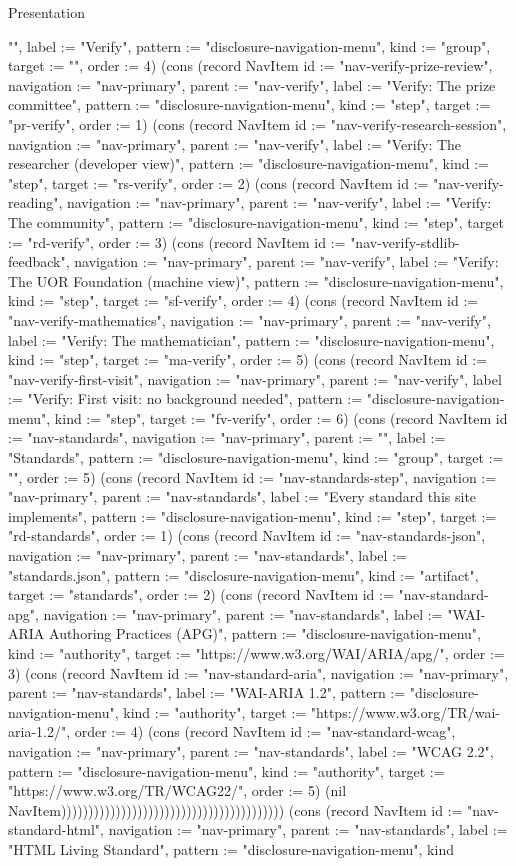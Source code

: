 \begin{lexlean}{Presentation}
\begin{semanticmodule}
{"", label := "Verify", pattern := "disclosure-navigation-menu", kind := "group", target := "", order := 4}) (cons (record NavItem {id := "nav-verify-prize-review", navigation := "nav-primary", parent := "nav-verify", label := "Verify: The prize committee", pattern := "disclosure-navigation-menu", kind := "step", target := "pr-verify", order := 1}) (cons (record NavItem {id := "nav-verify-research-session", navigation := "nav-primary", parent := "nav-verify", label := "Verify: The researcher (developer view)", pattern := "disclosure-navigation-menu", kind := "step", target := "rs-verify", order := 2}) (cons (record NavItem {id := "nav-verify-reading", navigation := "nav-primary", parent := "nav-verify", label := "Verify: The community", pattern := "disclosure-navigation-menu", kind := "step", target := "rd-verify", order := 3}) (cons (record NavItem {id := "nav-verify-stdlib-feedback", navigation := "nav-primary", parent := "nav-verify", label := "Verify: The UOR Foundation (machine view)", pattern := "disclosure-navigation-menu", kind := "step", target := "sf-verify", order := 4}) (cons (record NavItem {id := "nav-verify-mathematics", navigation := "nav-primary", parent := "nav-verify", label := "Verify: The mathematician", pattern := "disclosure-navigation-menu", kind := "step", target := "ma-verify", order := 5}) (cons (record NavItem {id := "nav-verify-first-visit", navigation := "nav-primary", parent := "nav-verify", label := "Verify: First visit: no background needed", pattern := "disclosure-navigation-menu", kind := "step", target := "fv-verify", order := 6}) (cons (record NavItem {id := "nav-standards", navigation := "nav-primary", parent := "", label := "Standards", pattern := "disclosure-navigation-menu", kind := "group", target := "", order := 5}) (cons (record NavItem {id := "nav-standards-step", navigation := "nav-primary", parent := "nav-standards", label := "Every standard this site implements", pattern := "disclosure-navigation-menu", kind := "step", target := "rd-standards", order := 1}) (cons (record NavItem {id := "nav-standards-json", navigation := "nav-primary", parent := "nav-standards", label := "standards.json", pattern := "disclosure-navigation-menu", kind := "artifact", target := "standards", order := 2}) (cons (record NavItem {id := "nav-standard-apg", navigation := "nav-primary", parent := "nav-standards", label := "WAI-ARIA Authoring Practices (APG)", pattern := "disclosure-navigation-menu", kind := "authority", target := "https://www.w3.org/WAI/ARIA/apg/", order := 3}) (cons (record NavItem {id := "nav-standard-aria", navigation := "nav-primary", parent := "nav-standards", label := "WAI-ARIA 1.2", pattern := "disclosure-navigation-menu", kind := "authority", target := "https://www.w3.org/TR/wai-aria-1.2/", order := 4}) (cons (record NavItem {id := "nav-standard-wcag", navigation := "nav-primary", parent := "nav-standards", label := "WCAG 2.2", pattern := "disclosure-navigation-menu", kind := "authority", target := "https://www.w3.org/TR/WCAG22/", order := 5}) (nil NavItem))))))))))))))))))))))))))))))))))))))))) (cons (record NavItem {id := "nav-standard-html", navigation := "nav-primary", parent := "nav-standards", label := "HTML Living Standard", pattern := "disclosure-navigation-menu", kind }
\end{semanticmodule}
\end{lexlean}
